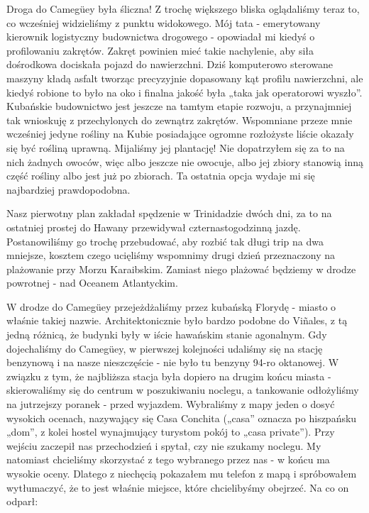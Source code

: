 Droga do Camegüey była śliczna! 
Z trochę większego bliska oglądaliśmy teraz to, co wcześniej widzieliśmy z punktu widokowego.
Mój tata - emerytowany kierownik logistyczny budownictwa drogowego - opowiadał mi kiedyś o profilowaniu zakrętów. 
Zakręt powinien mieć takie nachylenie, aby siła dośrodkowa dociskała pojazd do nawierzchni. 
Dziś komputerowo sterowane maszyny kładą asfalt tworząc precyzyjnie dopasowany kąt profilu nawierzchni, ale kiedyś robione to było na oko i finalna jakość była „taka jak operatorowi wyszło”. 
Kubańskie budownictwo jest jeszcze na tamtym etapie rozwoju, a przynajmniej tak wnioskuję z przechylonych do zewnątrz zakrętów. 
Wspomniane przeze mnie wcześniej jedyne rośliny na Kubie posiadające ogromne rozłożyste liście okazały się być rośliną uprawną. 
Mijaliśmy jej plantację!
Nie dopatrzyłem się za to na nich żadnych owoców, więc albo jeszcze nie owocuje, albo jej zbiory stanowią inną część rośliny albo jest już po zbiorach. 
Ta ostatnia opcja wydaje mi się najbardziej prawdopodobna.
\par Nasz pierwotny plan zakładał spędzenie w Trinidadzie dwóch dni, za to na ostatniej prostej do Hawany przewidywał czternastogodzinną jazdę. 
Postanowiliśmy go trochę przebudować, aby rozbić tak długi trip na dwa mniejsze, kosztem czego ucięliśmy wspomnimy drugi dzień przeznaczony na plażowanie przy Morzu Karaibskim. 
Zamiast niego plażować będziemy w drodze powrotnej - nad Oceanem Atlantyckim.
\par W drodze do Camegüey przejeżdżaliśmy przez kubańską Florydę - miasto o właśnie takiej nazwie.
Architektonicznie było bardzo podobne do Viñales, z tą jedną różnicą, że budynki były w iście hawańskim stanie agonalnym. 
Gdy dojechaliśmy do Camegüey, w pierwszej kolejności udaliśmy się na stację benzynową i na nasze nieszczęście - nie było tu benzyny 94-ro oktanowej. 
W związku z tym, że najbliższa stacja była dopiero na drugim końcu miasta - skierowaliśmy się do centrum w poszukiwaniu noclegu, a tankowanie odłożyliśmy na jutrzejszy poranek - przed wyjazdem. 
Wybraliśmy z mapy jeden o dosyć wysokich ocenach, nazywający się Casa Conchita („casa” oznacza po hiszpańsku „dom”, z kolei hostel wynajmujący turystom pokój to „casa private”). 
Przy wejściu zaczepił nas przechodzień i spytał, czy nie szukamy noclegu. My natomiast chcieliśmy skorzystać z tego wybranego przez nas - w końcu ma wysokie oceny. Dlatego z niechęcią pokazałem mu telefon z mapą i spróbowałem wytłumaczyć, że to jest właśnie miejsce, które chcielibyśmy obejrzeć. Na co on odparł:

